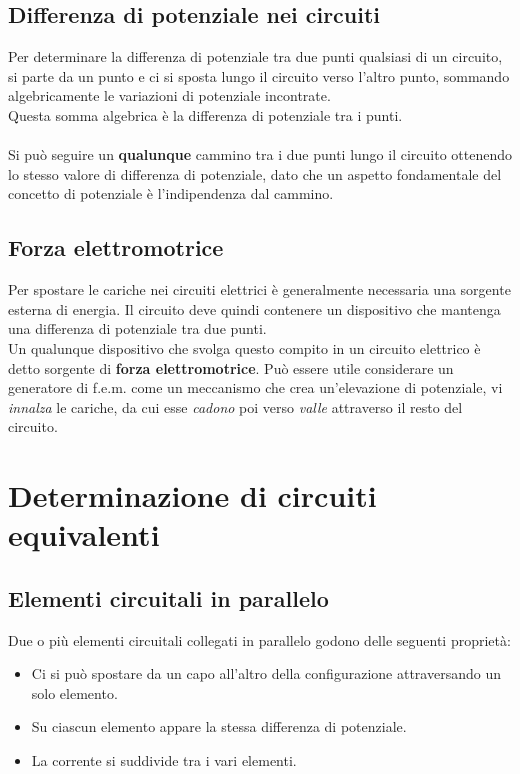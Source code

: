 \subsection{Differenza di potenziale nei circuiti}
Per determinare la differenza di potenziale tra due punti qualsiasi di un circuito, si parte da un punto e ci si sposta lungo il circuito verso l'altro punto, sommando algebricamente le variazioni di potenziale incontrate.\\
Questa somma algebrica è la differenza di potenziale tra i punti.\\\\
Si può seguire un \textbf{qualunque} cammino tra i due punti lungo il circuito ottenendo lo stesso valore di differenza di potenziale, dato che un aspetto fondamentale del concetto di potenziale è l'indipendenza dal cammino.

\subsection{Forza elettromotrice}
Per spostare le cariche nei circuiti elettrici è generalmente necessaria una sorgente esterna di energia. Il circuito deve quindi contenere un dispositivo che mantenga una differenza di potenziale tra due punti.\\
Un qualunque dispositivo che svolga questo compito in un circuito elettrico è detto sorgente di \textbf{forza elettromotrice}. Può essere utile considerare un generatore di f.e.m. come un meccanismo che crea un'elevazione di potenziale, vi \textit{innalza} le cariche, da cui esse \textit{cadono} poi verso \textit{valle} attraverso il resto del circuito.

\section{Determinazione di circuiti equivalenti}
\subsection*{Elementi circuitali in parallelo}
Due o più elementi circuitali collegati in parallelo godono delle seguenti proprietà:
\begin{itemize}
\item{Ci si può spostare da un capo all'altro della configurazione attraversando un solo elemento.}
\item{Su ciascun elemento appare la stessa differenza di potenziale.}
\item{La corrente si suddivide tra i vari elementi.}
\end{itemize}

